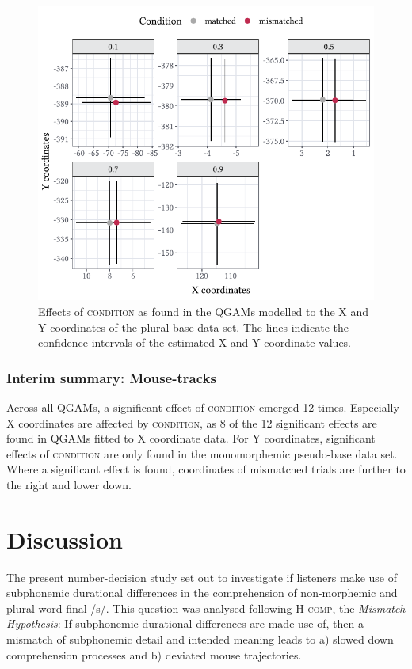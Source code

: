 \begin{figure}
    \centering
    \includegraphics[]{figures/fig7.11.pdf}
    \caption{Effects of \textsc{condition} as found in the QGAMs modelled to the X and Y coordinates of the plural base data set. The lines indicate the confidence intervals of the estimated X and Y coordinate values.}
    \label{fig:7_11}
\end{figure}

\subsubsection{Interim summary: Mouse-tracks}\label{section07_2_3_3}

Across all QGAMs, a significant effect of \textsc{condition} emerged 12 times. Especially X coordinates are affected by \textsc{condition}, as 8 of the 12 significant effects are found in QGAMs fitted to X coordinate data. For Y coordinates, significant effects of \textsc{condition} are only found in the monomorphemic pseudo-base data set. Where a significant effect is found, coordinates of mismatched trials are further to the right and lower down.

\section{Discussion}\label{section07_3}

The present number-decision study set out to investigate if listeners make use of subphonemic durational differences in the comprehension of non-morphemic and plural word-final /s/. This question was analysed following \textsc{H comp}, the \textit{Mismatch Hypothesis}: If subphonemic durational differences are made use of, then a mismatch of subphonemic detail and intended meaning leads to a) slowed down comprehension processes and b) deviated mouse trajectories.

